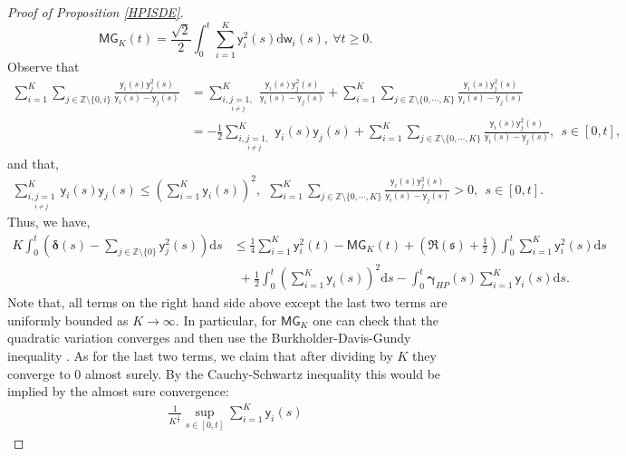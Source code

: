 \documentclass[]{article}
\begin{document}
\begin{proof}[Proof of Proposition \ref{HPISDE}]
 \begin{equation*}
 \mathsf{MG}_K(t)=\frac{\sqrt{2}}{2}\int_0^t\sum_{i=1}^K \mathsf{y}_i^2(s)\mathrm{d}\mathsf{w}_i(s), \ \forall t \ge 0.
 \end{equation*}
 Observe that
 \begin{align*}
\sum_{i=1}^K\sum_{j\in\mathbb{Z}\setminus\{0,i\}}
\frac{\mathsf{y}_i(s)\mathsf{y}_j^2(s)}{\mathsf{y}_i(s)-\mathsf{y}_j(s)}
&=
\sum_{\underset{i\neq j}{i,j=1,}}^K\
\frac{\mathsf{y}_i(s)\mathsf{y}_j^2(s)}{\mathsf{y}_i(s)-\mathsf{y}_j(s)}
+
\sum_{i=1}^K\sum_{j\in\mathbb{Z}\setminus\{0,\cdots,K\}}
\frac{\mathsf{y}_i(s)\mathsf{y}_j^2(s)}{\mathsf{y}_i(s)-\mathsf{y}_j(s)}
\\
&=
-\frac{1}{2}\sum_{\underset{i\neq j}{i,j=1,}}^K\
\mathsf{y}_i(s)\mathsf{y}_j(s)
+
\sum_{i=1}^K\sum_{j\in\mathbb{Z}\setminus\{0,\cdots,K\}}
\frac{\mathsf{y}_i(s)\mathsf{y}_j^2(s)}{\mathsf{y}_i(s)-\mathsf{y}_j(s)}, 
\  \ s\in [0,t],
 \end{align*}
and that, 
 \begin{align*}
\sum_{\underset{i\neq j}{i,j=1}}^K\
\mathsf{y}_i(s)\mathsf{y}_j(s) 
\le 
\left( \sum_{i=1}^K \mathsf{y}_i(s)\right)^2
,\  \ 
\sum_{i=1}^K\sum_{j\in\mathbb{Z}\setminus\{0,\cdots,K\}}
\frac{\mathsf{y}_i(s)\mathsf{y}_j^2(s)}{\mathsf{y}_i(s)-\mathsf{y}_j(s)}>0, 
\  \ s\in [0,t].
 \end{align*}
Thus, we have,
\begin{align}\label{delta-sum^2Bound}
K\int_0^t
\left(\boldsymbol{\delta}(s)
-
\sum_{j\in\mathbb{Z}\setminus\{0\}}
\mathsf{y}_j^2(s)\right)
\mathrm{d}s
&\le
      \frac{1}{4}\sum_{i=1}^K\mathsf{y}_i^2(t) 
-\mathsf{MG}_K(t)
+
\left(\Re{(\mathfrak{s})}
+\frac{1}{2}\right)
\int_0^t
\sum_{i=1}^K\mathsf{y}_i^2(s)\mathrm{d}s
 \nonumber\\
& \ \ +
\frac{1}{2}\int_0^t\left(\sum_{i=1}^K \mathsf{y}_i(s)\right)^2
\mathrm{d}s
-
\int_0^t\boldsymbol{\gamma}_{HP}(s)
\sum_{i=1}^K\mathsf{y}_i(s)
\mathrm{d}s.
\end{align}
Note that, all terms on the right hand side above except the last two terms are uniformly bounded as $K\to\infty$. In particular, for $\mathsf{MG}_K$ one can check that the quadratic variation converges and then use the Burkholder-Davis-Gundy inequality \cite{Kallenberg}. As for the last two terms, we claim that after dividing by $K$ they converge to $0$ almost surely. By the Cauchy-Schwartz inequality this would be implied by the almost sure convergence:
 \begin{align*}
    \frac{1}{K^{\frac{1}{2}}}\sup_{s\in [0,t]}\sum_{i=1}^K \mathsf{y}_i(s)

\end{align*}
\end{proof}
\end{document}

